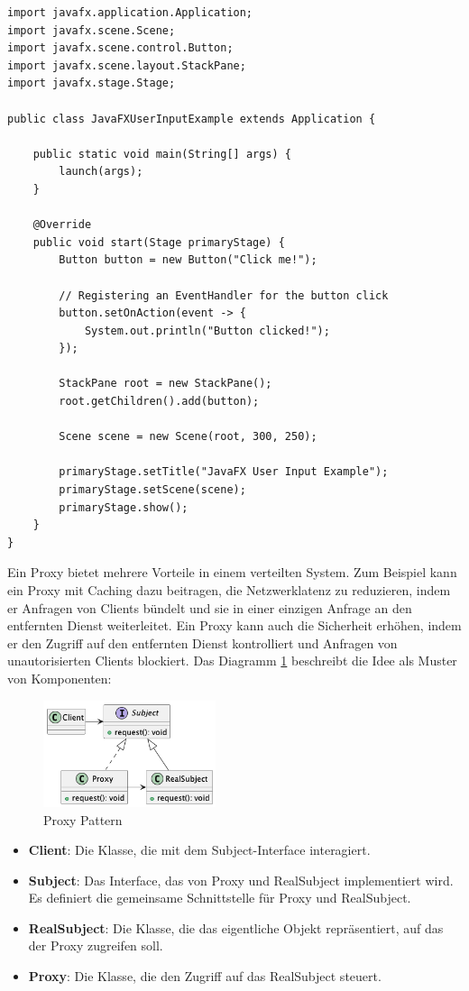 \noindent\begin{minipage}{\textwidth}
\begin{lstlisting}[caption={Java FX Input},captionpos=b,label={lst:javafx-input}]
import javafx.application.Application;
import javafx.scene.Scene;
import javafx.scene.control.Button;
import javafx.scene.layout.StackPane;
import javafx.stage.Stage;

public class JavaFXUserInputExample extends Application {

    public static void main(String[] args) {
        launch(args);
    }

    @Override
    public void start(Stage primaryStage) {
        Button button = new Button("Click me!");

        // Registering an EventHandler for the button click
        button.setOnAction(event -> {
            System.out.println("Button clicked!");
        });

        StackPane root = new StackPane();
        root.getChildren().add(button);

        Scene scene = new Scene(root, 300, 250);

        primaryStage.setTitle("JavaFX User Input Example");
        primaryStage.setScene(scene);
        primaryStage.show();
    }
}
\end{lstlisting}
\end{minipage}

Ein Proxy bietet mehrere Vorteile in einem verteilten System. Zum Beispiel kann ein Proxy mit Caching dazu beitragen, die Netzwerklatenz zu reduzieren, indem er Anfragen von Clients bündelt und sie in einer einzigen Anfrage an den entfernten Dienst weiterleitet. Ein Proxy kann auch die Sicherheit erhöhen, indem er den Zugriff auf den entfernten Dienst kontrolliert und Anfragen von unautorisierten Clients blockiert. Das Diagramm \ref{fig:proxy} beschreibt die Idee als Muster von Komponenten:
\begin{figure}[ht]
  \centering
  \includegraphics[width=0.45\textwidth]{fig/uml/proxy.png}
  \caption{Proxy Pattern}
  \label{fig:proxy}
\end{figure}
\begin{itemize}
\item \textbf{Client}: Die Klasse, die mit dem Subject-Interface interagiert.
\item \textbf{Subject}: Das Interface, das von Proxy und RealSubject implementiert wird. Es definiert die gemeinsame Schnittstelle für Proxy und RealSubject.
\item \textbf{RealSubject}: Die Klasse, die das eigentliche Objekt repräsentiert, auf das der Proxy zugreifen soll.
\item \textbf{Proxy}: Die Klasse, die den Zugriff auf das RealSubject steuert.
\end{itemize}

